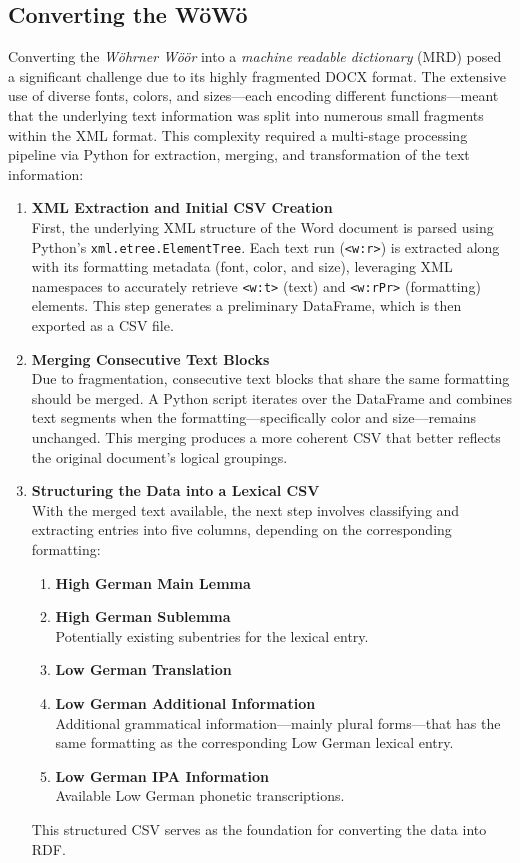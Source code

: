\documentclass{article}
\begin{document}
\subsection{Converting the WöWö}

Converting the \emph{Wöhrner Wöör} into a \emph{machine readable dictionary} (MRD) posed a significant challenge due to its highly fragmented DOCX format. The extensive use of diverse fonts, colors, and sizes—each encoding different functions—meant that the underlying text information was split into numerous small fragments within the XML format. This complexity required a multi-stage processing pipeline via Python for extraction, merging, and transformation of the text information:

\begin{enumerate}
    \item \textsf{\textbf{XML Extraction and Initial CSV Creation}}\\  
    First, the underlying XML structure of the Word document is parsed using Python’s \texttt{xml.etree.ElementTree}. Each text run (\texttt{<w:r>}) is extracted along with its formatting metadata (font, color, and size), leveraging XML namespaces to accurately retrieve \texttt{<w:t>} (text) and \texttt{<w:rPr>} (formatting) elements. This step generates a preliminary DataFrame, which is then exported as a CSV file.

    \item \textsf{\textbf{Merging Consecutive Text Blocks}}\\  
    Due to fragmentation, consecutive text blocks that share the same formatting should be merged. A Python script iterates over the DataFrame and combines text segments when the formatting—specifically color and size—remains unchanged. This merging produces a more coherent CSV that better reflects the original document’s logical groupings.

    \item \textsf{\textbf{Structuring the Data into a Lexical CSV}}\\  
    With the merged text available, the next step involves classifying and extracting entries into five columns, depending on the corresponding formatting:
    \begin{enumerate}
        \item \textsf{\textbf{High German Main Lemma}}
        \item \textsf{\textbf{High German Sublemma}}\\Potentially existing subentries for the lexical entry.
        \item \textsf{\textbf{Low German Translation}}
        \item \textsf{\textbf{Low German Additional Information}}\\ Additional grammatical information—mainly plural forms—that has the same formatting as the corresponding Low German lexical entry.
        \item \textsf{\textbf{Low German IPA Information}}\\Available Low German phonetic transcriptions.
    \end{enumerate}
    This structured CSV serves as the foundation for converting the data into RDF.


\end{enumerate}
\end{document}
